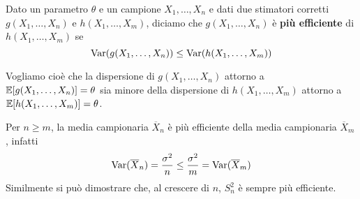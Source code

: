 \begin{definition}\label{def: stimatore efficiente}
	Dato un parametro $\theta$ e un campione $X_1, \dots, X_n$ e dati due stimatori corretti
	$g(X_1, \dots, X_n)$ e $h(X_1, \dots, X_m)$, diciamo che $g(X_1, \dots, X_n)$ è
	\textbf{più efficiente} di $h(X_1, \dots, X_m)$ se
	\[ \operatorname{Var}(g(X_1, \dots, X_n)) \leq \operatorname{Var}(h(X_1, \dots, X_m)) \]
\end{definition}

Vogliamo cioè che la dispersione di $g(X_1, \dots, X_n)$ attorno a
$\mathbb{E}[g(X_1, \dots, X_n)] = \theta$ sia minore della dispersione di $h(X_1, \dots, X_m)$ attorno a
$\mathbb{E}[h(X_1, \dots, X_m)] = \theta$.

Per $n \geq m$, la media campionaria $\overline{X}_n$ è più efficiente della media campionaria
$\overline{X}_m$, infatti
\[ \operatorname{Var}(\overline{X}_n) = \frac{\sigma^2}{n} \leq \frac{\sigma^2}{m} = \operatorname{Var}(\overline{X}_m) \]
Similmente si può dimostrare che, al crescere di $n$, $S_n^2$ è sempre più efficiente.